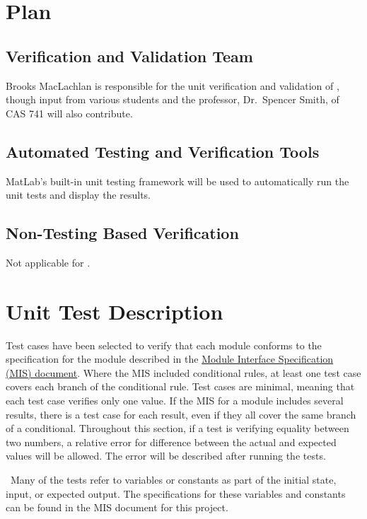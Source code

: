 \documentclass[12pt, titlepage]{article}
\begin{document}
\section{Plan} \label{sec_Plan}
	
\subsection{Verification and Validation Team}

\noindent Brooks MacLachlan is responsible for the unit verification and 
validation of \progname{}, though input from various students and the 
professor, Dr.~Spencer Smith, of CAS 741 will also contribute.

\subsection{Automated Testing and Verification Tools}

\noindent MatLab's built-in unit testing framework will be used to 
automatically run the unit tests and display the results.

\subsection{Non-Testing Based Verification}

Not applicable for \progname{}.

\section{Unit Test Description} \label{sec_Tests}

\noindent Test cases have been selected to verify that each module conforms to 
the specification for the module described in the 
\href{https://github.com/smiths/caseStudies/blob/master/CaseStudies/ssp/docs/Design/MIS/MIS.pdf}
{Module Interface Specification (MIS) document}. Where the MIS included 
conditional rules, at least one test case covers each branch of the conditional 
rule. Test cases are minimal, meaning that each test case verifies only one 
value. If the MIS for a module includes several results, there is a test case 
for each result, even if they all cover the same branch of a conditional. 
Throughout this section, if a test is verifying equality between two numbers, a 
relative error for difference between the actual and expected values will 
be allowed. The error will be described after running the tests. 

~\newline \noindent Many of the tests refer to variables or constants as part 
of the initial state, input, or expected output. The specifications for these 
variables and constants can be found in the MIS document for this project.
\end{document}
